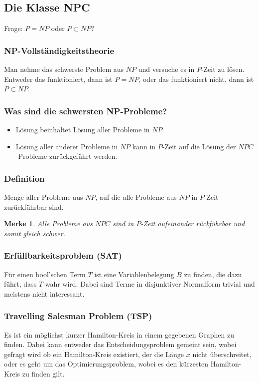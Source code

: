 \documentclass{article}
\begin{document}
\subsection{Die Klasse NPC}
Frage: $P = NP$ oder $P \subset NP$?
\subsubsection{NP-Vollständigkeitstheorie}
Man nehme das schwerste Problem aus $NP$ und versuche es in $P$-Zeit zu lösen.\\
Entweder das funktioniert, dann ist $P = NP$, oder das funktioniert nicht, dann ist $P \subset NP$.
\subsubsection{Was sind die schwersten NP-Probleme?}
\begin{itemize}
    \item Lösung beinhaltet Lösung aller Probleme in $NP$.
    \item Lösung aller anderer Probleme in $NP$ kann in $P$-Zeit auf die Lösung der $NPC$-Probleme zurückgeführt werden.
\end{itemize}
\subsubsection{Definition}
Menge aller Probleme aus $NP$, auf die alle Probleme aus $NP$ in $P$-Zeit zurückführbar sind.
\begin{framed}
    \newtheorem*{allenpc}{Merke}
    \begin{allenpc}
        Alle Probleme aus $NPC$ sind in $P$-Zeit aufeinander rückführbar und somit gleich schwer. 
    \end{allenpc}
\end{framed}
\subsubsection{Erfüllbarkeitsproblem (SAT)}
Für einen bool'schen Term $T$ ist eine Variablenbelegung $B$ zu finden, die dazu führt, dass $T$ wahr wird. Dabei sind Terme in disjunktiver Normalform trivial und meistens nicht interessant.

\subsubsection{Travelling Salesman Problem (TSP)}
Es ist ein möglichst kurzer Hamilton-Kreis in einem gegebenen Graphen zu finden. Dabei kann entweder das Entscheidungsproblem gemeint sein, wobei gefragt wird ob ein Hamilton-Kreis existiert, der die Länge $x$ nicht überschreitet, oder es geht um das Optimierungsproblem, wobei es den kürzesten Hamilton-Kreis zu finden gilt.
\end{document}

